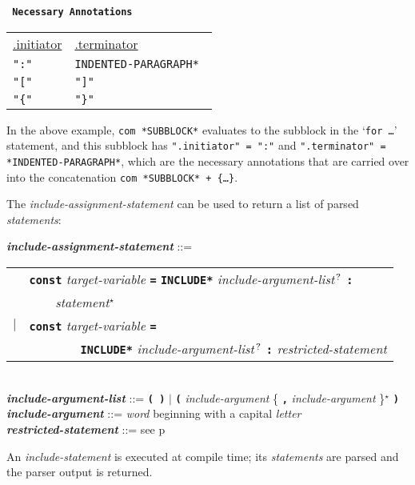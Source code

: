 \documentclass[12pt]{article}
\newcommand{\TT}[1]{{\tt \bfseries #1}}
\newcommand{\STAR}{{\Large $^\star$}}
\newcommand{\QMARK}{{$^{\,\mbox{\footnotesize ?}}$}}
\newcommand{\emkey}[1]{{\em \bfseries #1}}
\newcommand{\pagref}[1]{p\pageref{#1}}
\newenvironment{indpar}[1][0.3in]%
	{\begin{list}{}%
		     {\setlength{\itemsep}{0in}%
		      \setlength{\topsep}{0in}%
		      \setlength{\parsep}{1ex}%
		      \setlength{\labelwidth}{#1}%
		      \setlength{\leftmargin}{#1}%
		      \addtolength{\leftmargin}{\labelsep}}%
	 \item}%
	{\end{list}}
\begin{document}
\begin{center} \tt
{\rm \bf Necessary Annotations}
\\[1ex]
\begin{tabular}{l@{~~~~~~~~~~}l}
\underline{.initiator} & \underline{.terminator}
\\[1ex]
\tt ":" & \tt *INDENTED-PARAGRAPH* \\
\tt "[" & \tt "]" \\
\tt "\{" & \tt "\}" \\
\end{tabular}
\end{center}

In the above example, {\tt com *SUBBLOCK*} evaluates to the
subblock in the `{\tt for \ldots}' statement, and this subblock
has {\tt ".initiator" = ":"} and {\tt ".terminator" = *INDENTED-PARA\-GRAPH*},
which are the necessary annotations that are carried over into
the concatenation
{\tt com *SUBBLOCK* + \{\ldots\}}.

The {\em include-assignment-statement} can be used to return a list
of parsed {\em statements}:

\begin{indpar}
\emkey{include-assignment-statement}\label{INCLUDE-ASSIGNMENT-STATEMENT} ::= \\
\hspace*{0.3in}
    \begin{tabular}[t]{rl}
    & \TT{const} {\em target-variable} \TT{=} \TT{*INCLUDE*}
    	{\em include-argument-list}\QMARK{} \TT{:} \\
    & \TT{~~~~}{\em statement}\STAR{} \\
    $|$ & \TT{const} {\em target-variable} \TT{=} \\
    & ~~~~~~~~\TT{*INCLUDE*}
    	{\em include-argument-list}\QMARK{} \TT{:}
	{\em restricted-statement} \\
    \end{tabular}
\\[0.5ex]
\emkey{include-argument-list} ::= \TT{( )} $|$
	\TT{(} {\em include-argument}
	\{ \TT{,} {\em include-argument} \}\STAR{} \TT{)}
\\[0.5ex]
\emkey{include-argument} ::= {\em word} beginning with a capital {\em letter}
\\[0.5ex]
\emkey{restricted-statement} ::= see \pagref{RESTRICTED-STATEMENT}

\end{indpar}

An {\em include-statement} is executed at compile time;
its {\em statements} are parsed and the parser output is
returned.
\end{document}
